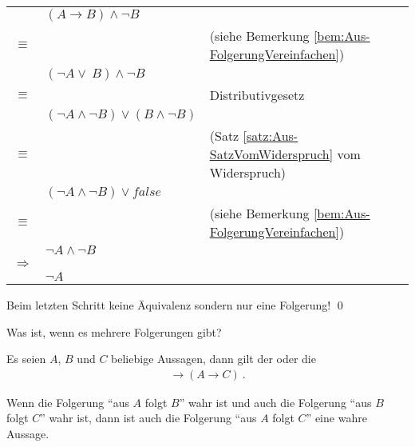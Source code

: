 \begin{Unit}
\begin{tabular}{c l l}
    & $(A \rightarrow B) \land \neg B$ & \\
  $\equiv$ &  & (siehe Bemerkung \ref{bem:Aus-FolgerungVereinfachen}) \\
   & $(\neg A \lor\ B) \land \neg B$ \\
  $\equiv$ &  & Distributivgesetz \\
   & $(\neg A \land \neg B) \lor (B \land \neg B)$ &  \\
  $\equiv$ &  & (Satz \ref{satz:Aus-SatzVomWiderspruch} vom Widerspruch) \\
   & $(\neg A \land \neg B) \lor false$ &  \\
  $\equiv$ &  &  (siehe Bemerkung \ref{bem:Aus-FolgerungVereinfachen}) \\
   & $\neg A \land \neg B$ &  \\
  $\Rightarrow$ &  &  \\
   & $\neg A$ &  \\
\end{tabular}

Beim letzten Schritt keine Äquivalenz sondern nur eine Folgerung!
\qed 
\end{Unit}

\begin{Unit} 
Was ist, wenn es mehrere Folgerungen gibt?

\begin{Satz} Es seien $A$, $B$ und $C$ beliebige Aussagen, dann gilt der 
 oder die 
\begin{align}
  [(A \rightarrow B) \land (B \rightarrow C)] \rightarrow (A \rightarrow C) 
  \ .
\end{align}
\end{Satz}

Wenn die Folgerung \enquote{aus $A$ folgt $B$} wahr ist und auch die 
Folgerung \enquote{aus $B$ folgt $C$} wahr ist, dann ist auch die 
Folgerung \enquote{aus $A$ folgt $C$} eine wahre Aussage.

\end{Unit}

